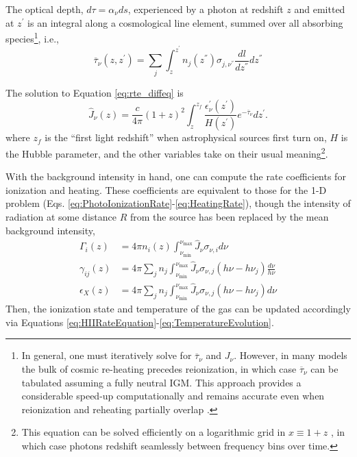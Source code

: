 The optical depth, $d\tau = \alpha_{\nu} ds$, experienced by a photon at redshift $z$ and emitted at $z^{\prime}$ is an integral along a cosmological line element, summed over all absorbing species\footnote{In general, one must iteratively solve for $\overline{\tau}_{\nu}$ and $J_{\nu}$. However, in many models the bulk of cosmic re-heating precedes reionization, in which case $\overline{\tau}_{\nu}$ can be tabulated assuming a fully neutral IGM. This approach provides a considerable speed-up computationally and remains accurate even when reionization and reheating partially overlap \cite{Mirocha2014}.
}, i.e., 
\begin{equation}
    \overline{\tau}_{\nu}(z, z^{\prime}) = \sum_j \int_{z}^{z^{\prime}} n_j(z^{\dprime}) \sigma_{j, \nu^{\dprime}} \frac{dl}{dz^{\dprime}}dz^{\dprime} \label{eq:tau_igm}
\end{equation}

The solution to Equation \ref{eq:rte_diffeq} is
\begin{equation}
    \hat{J}_{\nu} (z) = \frac{c}{4\pi} (1 + z)^2 \int_{z}^{z_f} \frac{\epsilon_{\nu}^{\prime}(z^{\prime})}{H(z^{\prime})} e^{-\overline{\tau}_{\nu}} dz^{\prime} . \label{eq:AngleAveragedFlux}
\end{equation}    
where $z_f$ is the ``first light redshift'' when astrophysical sources first turn on, $H$ is the Hubble parameter, and the other variables take on their usual meaning\footnote{This equation can be solved efficiently on a logarithmic grid in $x\equiv 1+z$ \cite{Haardt1996,Mirocha2014}, in which case photons redshift seamlessly between frequency bins over time.}. 

With the background intensity in hand, one can compute the rate coefficients for ionization and heating. These coefficients are equivalent to those for the 1-D problem (Eqs. \ref{eq:PhotoIonizationRate}-\ref{eq:HeatingRate}), though the intensity of radiation at some distance $R$ from the source has been replaced by the mean background intensity,
\begin{align}
    \Gamma_{i}(z) & = 4 \pi n_i(z) \int_{\nu_{\min}}^{\nu_{\max}} \hat{J}_{\nu} \sigma_{\nu,i} d\nu  \\
    \gamma_{ij}(z) & = 4 \pi \sum_j n_j \int_{\nu_{\min}}^{\nu_{\max}}  \hat{J}_{\nu} \sigma_{\nu,j} (h\nu - h\nu_j) \frac{d\nu}{h\nu}  \\
    \epsilon_X(z) & = 4 \pi \sum_j n_j \int_{\nu_{\min}}^{\nu_{\max}}  \hat{J}_{\nu}  \sigma_{\nu,j} (h\nu - h\nu_j) d\nu
\end{align}
Then, the ionization state and temperature of the gas can be updated accordingly via Equations \ref{eq:HIIRateEquation}-\ref{eq:TemperatureEvolution}.


